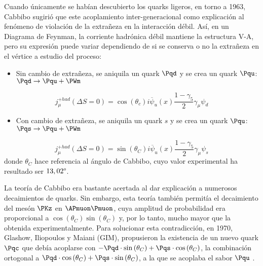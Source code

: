 Cuando únicamente se habían descubierto los quarks ligeros, en torno a 1963, Cabbibo sugirió que este acoplamiento inter-generacional como explicación al fenómeno de violación de la extrañeza en la interacción débil. Así, en un Diagrama de Feynman, la corriente hadrónica débil mantiene la estructura V-A, pero su expresión puede variar dependiendo de si se conserva o no la extrañeza en el vértice a estudio del proceso:
\begin{itemize}
\item Sin cambio de extrañeza, se aniquila un quark $\Pqd$ y se crea un quark $\Pqu$: $\Pqd \rightarrow \Pqu + \PWm$
\end{itemize}
\begin{equation}
j_{\mu}^{+had}(\Delta S= 0)=\cos \left( \theta _{c}\right) i\overline{\psi }_{u}\left( x\right) \dfrac{1-\gamma _{5}}{2}\gamma _{\mu }\psi _{d}
\end{equation}
\begin{itemize}
\item Con cambio de extrañeza, se aniquila un quark $s$ y se crea un quark $\Pqu$: $\Pqs \rightarrow \Pqu + \PWm$
\end{itemize}
\begin{equation}
j_{\mu}^{+had}(\Delta S= 0)=\sin \left( \theta _{C}\right) i\overline{\psi }_{u}\left( x\right) \dfrac{1-\gamma _{5}}{2}\gamma _{\mu }\psi _{s}
\end{equation}
donde $\theta_{C}$ hace referencia al ángulo de Cabbibo, cuyo valor experimental ha resultado ser $13,02\degree$.

La teoría de Cabbibo era bastante acertada al dar explicación a numerosos decaimientos de quarks. Sin embargo, esta teoría también permitía el decaimiento del mesón $\PKz$ en $\APmuon\Pmuon$, cuya amplitud de probabilidad era proporcional a $\cos \left( \theta _{C}\right) \sin \left( \theta _{C}\right)$ y, por lo tanto, mucho mayor que la obtenida experimentalmente.  Para solucionar esta contradicción, en 1970, Glashow, Iliopoulos y Maiani (GIM), propusieron la existencia de un nuevo quark $\Pqc$ que debía acoplarse con $-\Pqd \cdot \sin \left( \theta _{C}\right) + \Pqs \cdot \cos \left( \theta_C \right)$, la combinación ortogonal a $\Pqd \cdot \cos \left( \theta _{C}\right) + \Pqs \cdot \sin \left( \theta _{C}\right)$, a la que se acoplaba el sabor $\Pqu$ \cite{Griffiths2008}.

